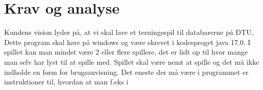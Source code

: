 \section{Krav og analyse}
Kundens vision lyder på, at vi skal lave et terningespil til databarerne på DTU. Dette program skal køre på windows og være skrevet i kodesproget java 17.0. I spillet kan man mindst være 2 eller flere spillere, det er lidt op til hvor mange man selv har lyst til at spille med. Spillet skal være nemt at spille og det må ikke indholde en form for brugsanvisning. Det eneste der må være i programmet er instruktioner til, hvordan at man f.eks i